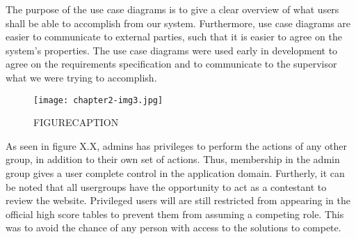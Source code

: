 The purpose of the use case diagrams is to give a clear overview of what
users shall be able to accomplish from our system. Furthermore, use
case diagrams are easier to communicate to external parties, such that
it is easier to agree on the system's properties. The
use case diagrams were used early in development to agree on the
requirements specification and to communicate to the supervisor what we
were trying to accomplish.

\begin{figure}[h!]
	\texttt{[image: chapter2-img3.jpg]} 
	\caption{FIGURECAPTION}
\end{figure}
As seen in figure X.X, admins has privileges to perform the actions of
any other group, in addition to their own set of actions. Thus,
membership in the admin group gives a user complete control in the
application domain. Furtherly, it can be noted that all usergroups have
the opportunity to act as a contestant to review the website.
Privileged users will are still restricted from appearing in the
official high score tables to prevent them from assuming a competing
role. This was to avoid the chance of any person with access to the
solutions to compete.







